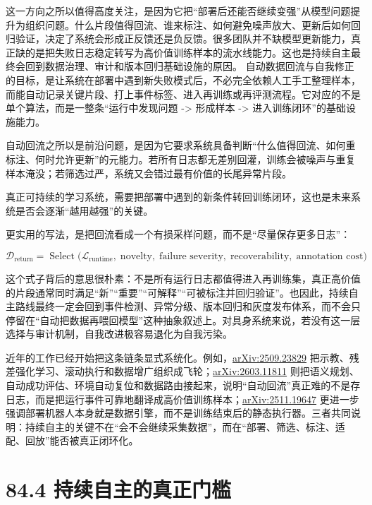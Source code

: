 这一方向之所以值得高度关注，是因为它把“部署后还能否继续变强”从模型问题提升为组织问题。什么片段值得回流、谁来标注、如何避免噪声放大、更新后如何回归验证，决定了系统会形成正反馈还是负反馈。很多团队并不缺模型更新能力，真正缺的是把失败日志稳定转写为高价值训练样本的流水线能力。这也是持续自主最终会回到数据治理、审计和版本回归基础设施的原因。 自动数据回流与自我修正的目标，是让系统在部署中遇到新失败模式后，不必完全依赖人工手工整理样本，而能自动记录关键片段、打上事件标签、进入再训练或再评测流程。它对应的不是单个算法，而是一整条“运行中发现问题 -> 形成样本 -> 进入训练闭环”的基础设施能力。

自动回流之所以是前沿问题，是因为它要求系统具备判断“什么值得回流、如何重标注、何时允许更新”的元能力。若所有日志都无差别回灌，训练会被噪声与重复样本淹没；若筛选过严，系统又会错过最有价值的长尾异常片段。

真正可持续的学习系统，需要把部署中遇到的新条件转回训练闭环，这也是未来系统是否会逐渐“越用越强”的关键。

更实用的写法，是把回流看成一个有损采样问题，而不是“尽量保存更多日志”：

\begingroup
\scriptsize
\begin{equation*}
\mathcal{D}_{\text{return}} =
\operatorname{Select}\!\bigl(\mathcal{L}_{\text{runtime}},\;
\text{novelty},\;
\text{failure severity},\;
\text{recoverability},\;
\text{annotation cost}\bigr)
\end{equation*}
\endgroup

这个式子背后的意思很朴素：不是所有运行日志都值得进入再训练集，真正高价值的片段通常同时满足“新”“重要”“可解释”“可被标注并回归验证”。也因此，持续自主路线最终一定会回到事件检测、异常分级、版本回归和灰度发布体系，而不会只停留在“自动把数据再喂回模型”这种抽象叙述上。对具身系统来说，若没有这一层选择与审计机制，自我改进极容易退化为自我污染。

近年的工作已经开始把这条链条显式系统化。例如，\href{https://arxiv.org/abs/2509.23829}{arXiv:2509.23829} 把示教、残差强化学习、滚动执行和数据增广组织成飞轮；\href{https://arxiv.org/abs/2603.11811}{arXiv:2603.11811} 则把语义规划、自动成功评估、环境自动复位和数据路由接起来，说明“自动回流”真正难的不是存日志，而是把运行事件可靠地翻译成高价值训练样本；\href{https://arxiv.org/abs/2511.19647}{arXiv:2511.19647} 更进一步强调部署机器人本身就是数据引擎，而不是训练结束后的静态执行器。三者共同说明：持续自主的关键不在“会不会继续采集数据”，而在“部署、筛选、标注、适配、回放”能否被真正闭环化。

\section*{84.4 持续自主的真正门槛}


